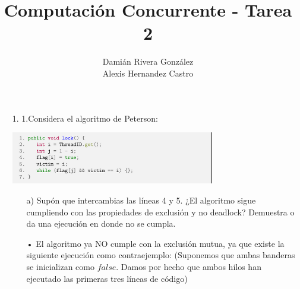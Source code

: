 \documentclass[12pt, letterpaper]{article}
\title{Computación Concurrente - Tarea 2}
\author{Damián Rivera González\\Alexis Hernandez Castro}
\begin{document}
\maketitle


\begin{itemize}
\item[1. ] 1.Considera el algoritmo de Peterson:\\

\begin{center}
\includegraphics[width=0.7\textwidth]{pettersonCode.png}\\
\end{center}
\begin{itemize}

\item[a) ] Sup\'on que intercambias las l\'ineas 4 y 5. ¿El algoritmo sigue cumpliendo
con las propiedades de exclusi\'on y no deadlock? Demuestra o da una
ejecuci\'on en donde no se cumpla.

\item[•]El algoritmo ya NO cumple con la exclusión mutua, ya que existe la siguiente ejecución como contraejemplo:
(Suponemos que ambas banderas se inicializan como $false$. Damos por hecho que ambos hilos han ejecutado las primeras tres líneas de código)

\\


\end{itemize}
\end{itemize}
\end{document}

